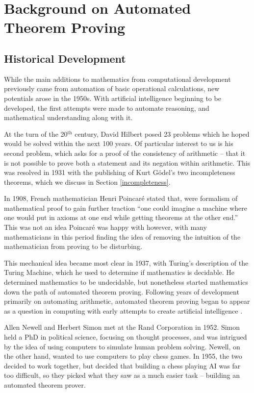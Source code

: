 \chapter{Background on Automated Theorem Proving}

\section{Historical Development}

While the main additions to mathematics from computational development previously came from automation of basic operational calculations, new potentials arose in the 1950s. With artificial intelligence beginning to be developed, the first attempts were made to automate reasoning, and mathematical understanding along with it.

At the turn of the 20$^{\text{th}}$ century, David Hilbert posed 23 problems which he hoped would be solved within the next 100 years. Of particular interest to us is his second problem, which asks for a proof of the consistency of arithmetic -- that it is not possible to prove both a statement and its negation within arithmetic. This was resolved in 1931 with the publishing of Kurt G\"odel's two incompleteness theorems, which we discuss in Section \ref{incompleteness}.

In 1908, French mathematician Henri Poincar\'e stated that, were formalism of mathematical proof to gain further traction ``one could imagine a machine where one would put in axioms at one end while getting theorems at the other end.'' This was not an idea Poincar\'e was happy with however, with many mathematicians in this period finding the idea of removing the intuition of the mathematician from proving to be disturbing.

This mechanical idea became most clear in 1937, with Turing's description of the Turing Machine, which he used to determine if mathematics is decidable. He determined mathematics to be undecidable, but nonetheless started mathematics down the path of automated theorem proving. Following years of development primarily on automating arithmetic, automated theorem proving began to appear as a question in computing with early attempts to create artificial intelligence \cite{history}.

Allen Newell and Herbert Simon met at the Rand Corporation in 1952. Simon held a PhD in political science, focusing on thought processes, and was intrigued by the idea of using computers to simulate human problem solving. Newell, on the other hand, wanted to use computers to play chess games. In 1955, the two decided to work together, but decided that building a chess playing AI was far too difficult, so they picked what they saw as a much easier task -- building an automated theorem prover.

